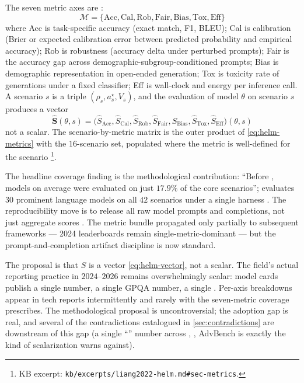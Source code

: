 The seven metric axes are
\citep[\S{}sec-metrics]{liang2022-helm}:
\begin{equation}
\mathcal{M} = \{
  \text{Acc}, \text{Cal}, \text{Rob}, \text{Fair}, \text{Bias},
  \text{Tox}, \text{Eff}
\}
\label{eq:helm-metrics}
\end{equation}
where Acc is task-specific accuracy (exact match, F1, BLEU); Cal is
calibration (Brier or expected calibration error between predicted
probability and empirical accuracy); Rob is robustness (accuracy
delta under perturbed prompts); Fair is the accuracy gap across
demographic-subgroup-conditioned prompts; Bias is demographic
representation in open-ended generation; Tox is toxicity rate of
generations under a fixed classifier; Eff is wall-clock and energy
per inference call. A scenario $s$ is a triple
$(\rho_s, a^\star_s, V_s)$, and the  evaluation of model
$\theta$ on scenario $s$ produces a vector
\begin{equation}
\hat{\mathbf{S}}(\theta, s) =
  \big(\hat{S}_{\text{Acc}}, \hat{S}_{\text{Cal}}, \hat{S}_{\text{Rob}},
       \hat{S}_{\text{Fair}}, \hat{S}_{\text{Bias}},
       \hat{S}_{\text{Tox}}, \hat{S}_{\text{Eff}}\big)(\theta, s)
\label{eq:helm-vector}
\end{equation}
not a scalar. The scenario-by-metric matrix is the outer product of
\eqref{eq:helm-metrics} with the $16$-scenario set, populated where
the metric is well-defined for the scenario%
\footnote{KB excerpt: \texttt{kb/excerpts/liang2022-helm.md\#sec-metrics}.}.

The headline coverage finding is the methodological contribution:
``Before , models on average were evaluated on just $17.9\%$ of
the core  scenarios'';  evaluates $30$ prominent language
models on all $42$ scenarios under a single harness
\citep[\S{}sec-coverage]{liang2022-helm}. The reproducibility move
is to release all raw model prompts and completions, not just
aggregate scores \citep[\S{}sec-output-discipline]{liang2022-helm}.
The metric bundle propagated only partially to subsequent frameworks
--- 2024 leaderboards remain single-metric-dominant --- but the
prompt-and-completion artifact discipline is now standard.

\begin{contradiction}
The  proposal is that $\hat{S}$ is a vector
\eqref{eq:helm-vector}, not a scalar. The field's actual reporting
practice in $2024$--$2026$ remains overwhelmingly scalar: model cards
publish a single  number, a single GPQA number, a single
 . Per-axis breakdowns appear in tech reports
intermittently and rarely with the seven-metric coverage 
prescribes. The methodological proposal is uncontroversial; the
adoption gap is real, and several of the contradictions catalogued
in \cref{sec:contradictions} are downstream of this gap (a single
``'' number across , , AdvBench is
exactly the kind of scalarization  warns against).
\end{contradiction}

